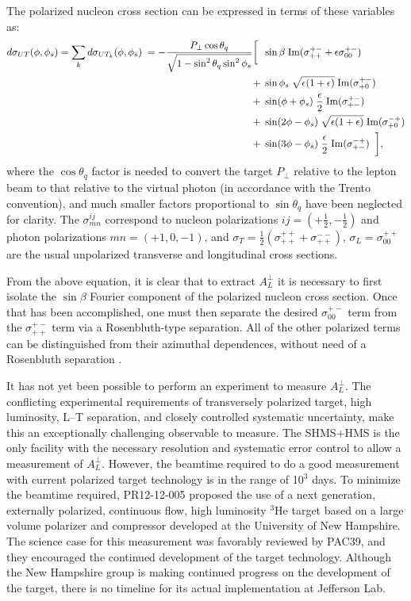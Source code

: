 The polarized nucleon cross section can be expressed \cite{Di05,hermes-thesis} 
in terms of these variables as:
\begin{equation}
\begin{split}\label{eqn:sigtarg}
d\sigma_{UT}(\phi,\phi_s) =  \sum_k d\sigma_{UT_k}(\phi,\phi_s) \;
= -\frac{P_\perp \cos\theta_q}{\sqrt{1-\sin^2\theta_q \sin^2\phi_s}} \biggl[\; 
  &\; \sin\beta \; \rm{Im}(\sigma^{+-}_{++} + \epsilon\sigma^{+-}_{00})\\
 +&\; \sin\phi_s \; \sqrt{\epsilon(1+\epsilon)}\; \rm{Im}(\sigma^{+-}_{+0})\\
 +&\; \sin(\phi+\phi_s) \; \frac{\epsilon}{2} \; \rm{Im}(\sigma^{+-}_{+-})\\
 +&\; \sin(2\phi-\phi_s) \; \sqrt{\epsilon(1+\epsilon)} \; \rm{Im}(\sigma^{-+}_{+0}) \\
 +&\; \sin(3\phi-\phi_s) \; \frac{\epsilon}{2} \; \rm{Im}(\sigma^{-+}_{+-})\;\; \biggr] ,
\end{split}
\end{equation}
where the $\cos\theta_q$ factor is needed to convert the target $P_\perp$
relative to the lepton beam to that relative to the virtual photon
(in accordance with the Trento convention), and much smaller factors
proportional to $\sin\theta_q$ have been neglected for clarity.  
The $\sigma^{ij}_{mn}$ correspond to nucleon polarizations
$ij=(+\frac{1}{2},-\frac{1}{2})$ and photon polarizations $mn=(+1,0,-1)$, and
$\sigma_T=\frac{1}{2}(\sigma^{++}_{++}+\sigma^{--}_{++})$,
$\sigma_L=\sigma^{++}_{00}$ are the usual unpolarized transverse and
longitudinal cross sections.

From the above equation, it is clear that to extract $A_L^{\perp}$
it is necessary to first isolate the 
$\sin \beta$ Fourier component of the polarized nucleon cross section.
Once that has been accomplished, one must then separate the desired
$\sigma^{+-}_{00}$ term 
from the $\sigma^{+-}_{++}$ term via a Rosenbluth-type separation.  All of the
other polarized terms can be distinguished from their azimuthal dependences,
without need of a Rosenbluth separation \cite{Di05}.

It has not yet been possible to perform an experiment to measure $A_L^{\perp}$.
The conflicting experimental requirements of transversely polarized target,
high luminosity, L--T separation, and closely controlled systematic
uncertainty, make this an exceptionally challenging observable to measure.  The
SHMS+HMS is the only facility with the necessary resolution and systematic
error control to allow a measurement of $A_L^{\perp}$.  However, the beamtime
required to do a good measurement with current polarized target technology is
in the range of 10$^3$ days.  To minimize the beamtime required, PR12-12-005
\cite{atpi39}
proposed the use of a next generation, externally polarized, continuous flow,
high luminosity $^3$He target based on a large volume polarizer and compressor
developed at the University of New Hampshire.  The science case
for this measurement was favorably reviewed by PAC39, and they encouraged the
continued development of the target technology.  Although the New Hampshire
group is making continued progress on the development of the target, there is
no timeline for its actual implementation at Jefferson Lab.

